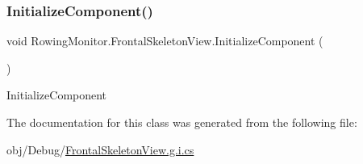 \subsubsection{\texorpdfstring{Initialize\+Component()}{InitializeComponent()}}
{\footnotesize\ttfamily void Rowing\+Monitor.\+Frontal\+Skeleton\+View.\+Initialize\+Component (\begin{DoxyParamCaption}{ }\end{DoxyParamCaption})}



Initialize\+Component 



The documentation for this class was generated from the following file\+:\begin{DoxyCompactItemize}
\item 
obj/\+Debug/\hyperlink{_frontal_skeleton_view_8g_8i_8cs}{Frontal\+Skeleton\+View.\+g.\+i.\+cs}\end{DoxyCompactItemize}

